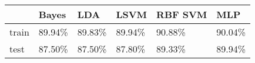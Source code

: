 \begin{tabular}{llllll}
\toprule
{} &   Bayes &     LDA &    LSVM & RBF SVM &     MLP \\
\midrule
train &  89.94\% &  89.83\% &  89.94\% &  90.88\% &  90.04\% \\
test  &  87.50\% &  87.50\% &  87.80\% &  89.33\% &  89.94\% \\
\bottomrule
\end{tabular}
